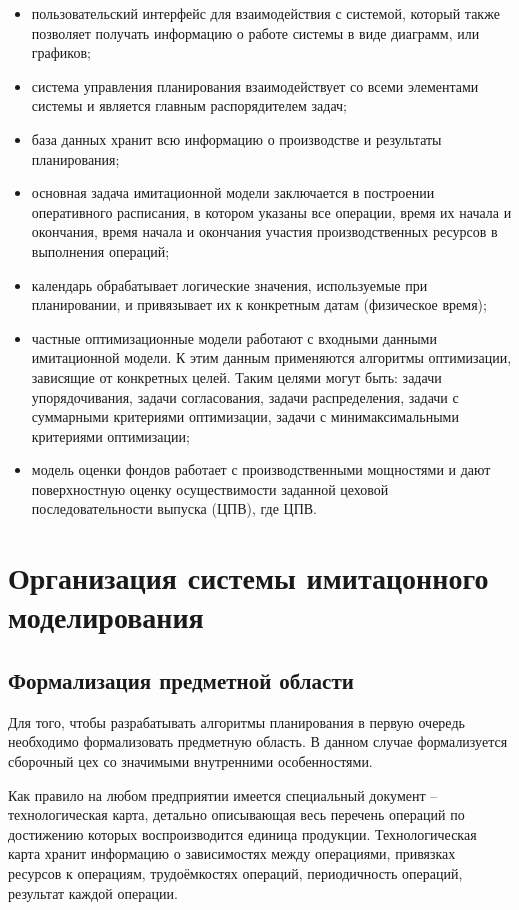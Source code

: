 \begin{itemize}
    \item пользовательский интерфейс для взаимодействия с системой, который также позволяет получать информацию о работе системы в виде диаграмм, или графиков; 
    \item система управления планирования взаимодействует со всеми элементами системы и является главным распорядителем задач;
    \item база данных хранит всю информацию о производстве и результаты планирования; 
    \item основная задача имитационной модели заключается в построении оперативного расписания, в котором указаны все операции, время их начала и окончания, время начала и окончания участия производственных ресурсов в выполнения операций;
    \item календарь обрабатывает логические значения, используемые при планировании, и привязывает их к конкретным датам (физическое время);
    \item частные оптимизационные модели работают с входными данными имитационной модели. К этим данным применяются алгоритмы оптимизации, зависящие от конкретных целей. Таким целями могут быть: задачи упорядочивания, задачи согласования, задачи распределения, задачи с суммарными критериями оптимизации, задачи с минимаксимальными критериями оптимизации;
    \item модель оценки фондов работает с производственными мощностями и дают поверхностную оценку осуществимости заданной цеховой последовательности выпуска (ЦПВ), где ЦПВ.
\end{itemize}

\section{Организация системы имитацонного моделирования}

\subsection{Формализация предметной области}

Для того, чтобы разрабатывать алгоритмы планирования в первую очередь необходимо формализовать предметную область. В данном случае формализуется сборочный цех со значимыми внутренними особенностями.

Как правило на любом предприятии имеется специальный документ – технологическая карта, детально описывающая весь перечень операций по достижению которых воспроизводится единица продукции. Технологическая карта хранит информацию о зависимостях между операциями, привязках ресурсов к операциям, трудоёмкостях операций, периодичность операций, результат каждой операции. 

